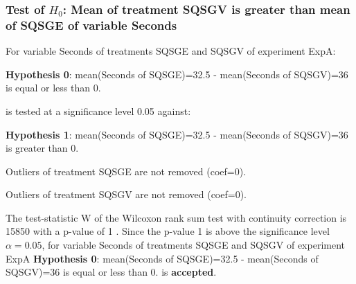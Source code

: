 \begin{frame}[t]
 \frametitle{Test of $H_{0}$: Mean of treatment SQSGV is greater than mean of SQSGE of variable Seconds }
 \scriptsize
 For variable Seconds of treatments SQSGE and SQSGV of experiment ExpA:

\vspace{1mm}
{\bf Hypothesis 0}: mean(Seconds of SQSGE)=32.5 - mean(Seconds of SQSGV)=36 is equal or less than 0.


 \begin{center} is tested at a significance level 0.05 against: \end{center}

{\bf Hypothesis 1}: mean(Seconds of SQSGE)=32.5 - mean(Seconds of SQSGV)=36 is greater than 0.
\vspace{1mm}
\vspace{1mm}

 Outliers of treatment SQSGE  are not removed (coef=0).

 Outliers of treatment SQSGV  are not removed (coef=0).
\vspace{1mm}
 
 The test-statistic W of the Wilcoxon rank sum test with continuity correction is 15850 with a p-value of 1 .
 Since the p-value 1 is above the significance level $\alpha= 0.05 $,
 for variable Seconds of treatments SQSGE and SQSGV of experiment ExpA 
 {\bf Hypothesis 0}: mean(Seconds of SQSGE)=32.5 - mean(Seconds of SQSGV)=36 is equal or less than 0.
is {\bf accepted}.

 \end{frame}
